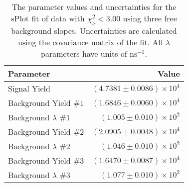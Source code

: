 
\begin{table}[ht]
    \begin{center}
        \begin{tabular}{lr}\toprule
            Parameter & Value \\\midrule
            Signal Yield & $(4.7381 \pm 0.0086) \times 10^{4}$ \\
            Background Yield $\#1$ & $(1.6846 \pm 0.0060) \times 10^{4}$ \\
            Background $\lambda$ $\#1$ & $(1.005 \pm 0.010) \times 10^{2}$ \\
            Background Yield $\#2$ & $(2.0905 \pm 0.0048) \times 10^{4}$ \\
            Background $\lambda$ $\#2$ & $(1.046 \pm 0.010) \times 10^{2}$ \\
            Background Yield $\#3$ & $(1.6470 \pm 0.0087) \times 10^{4}$ \\
            Background $\lambda$ $\#3$ & $(1.077 \pm 0.010) \times 10^{2}$ \\\bottomrule
        \end{tabular}
        \caption{The parameter values and uncertainties for the sPlot fit of data with $\chi^2_\nu < 3.00$ using three free background slopes. Uncertainties are calculated using the covariance matrix of the fit. All $\lambda$ parameters have units of $\si{\nano\second}^{-1}$.}\label{tab:splot-fit-results-chisqdof-3.00-free-3}
    \end{center}
\end{table}
